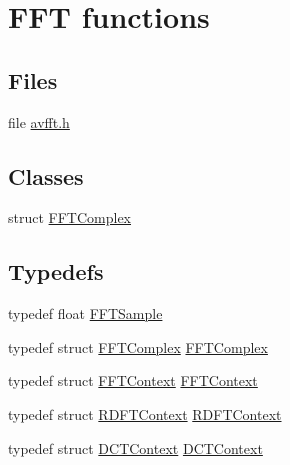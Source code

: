 \hypertarget{group__lavc__fft}{}\section{F\+FT functions}
\label{group__lavc__fft}
\subsection*{Files}
\begin{DoxyCompactItemize}
\item 
file \hyperlink{avfft_8h}{avfft.\+h}
\end{DoxyCompactItemize}
\subsection*{Classes}
\begin{DoxyCompactItemize}
\item 
struct \hyperlink{struct_f_f_t_complex}{F\+F\+T\+Complex}
\end{DoxyCompactItemize}
\subsection*{Typedefs}
\begin{DoxyCompactItemize}
\item 
typedef float \hyperlink{group__lavc__fft_gaa306dc16df543b25d9910debc3f76b96}{F\+F\+T\+Sample}
\item 
typedef struct \hyperlink{struct_f_f_t_complex}{F\+F\+T\+Complex} \hyperlink{group__lavc__fft_gab074aa9c1667258670818f7ed88375ee}{F\+F\+T\+Complex}
\item 
typedef struct \hyperlink{group__lavc__fft_gaac01e094370275491c7cbc580de0fe24}{F\+F\+T\+Context} \hyperlink{group__lavc__fft_gaac01e094370275491c7cbc580de0fe24}{F\+F\+T\+Context}
\item 
typedef struct \hyperlink{group__lavc__fft_gad6a19df0e8cfc4d67a325e4f91fd9cd9}{R\+D\+F\+T\+Context} \hyperlink{group__lavc__fft_gad6a19df0e8cfc4d67a325e4f91fd9cd9}{R\+D\+F\+T\+Context}
\item 
typedef struct \hyperlink{group__lavc__fft_ga904cbe02e46b560fd98d172fdb27c845}{D\+C\+T\+Context} \hyperlink{group__lavc__fft_ga904cbe02e46b560fd98d172fdb27c845}{D\+C\+T\+Context}
\end{DoxyCompactItemize}
